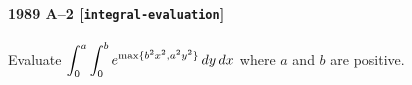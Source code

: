 \paragraph{1989 A--2 \textnormal{[\texttt{integral-evaluation}]}}
Evaluate
$\displaystyle{\int_0^a\int_0^b e^{{\rm max}\{b^2x^2, a^2y^2\}}\,dy\,dx}$
where $a$ and $b$ are positive.

